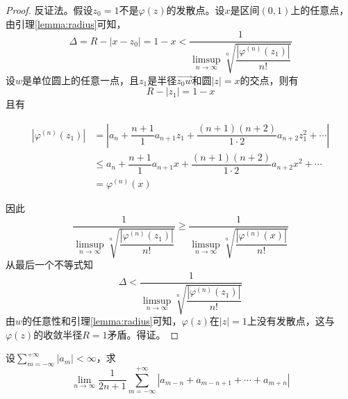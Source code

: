 \begin{proof}

    反证法。假设$z_0 = 1$不是$\varphi(z)$的发散点。设$x$是区间$(0, 1)$上的任意点，由引理\ref{lemma:radius}可知，
    $$\Delta = R - |x - z_0| = 1 - x < \dfrac{1}{\limsup\limits_{n \to \infty}{\sqrt[n]{\dfrac{|\varphi^{(n)}(z_1)|}{n!}}}}$$
    设$w$是单位圆上的任意一点，且$z_1$是半径$\vec{z_0w}$和圆$|z| = x$的交点，则有
    $$R - |z_1| = 1 - x$$
    且有
    
    \begin{align*}
        |\varphi^{(n)}(z_1)| & = \left| a_n + \dfrac{n + 1}{1} a_{n + 1}z_1 + \dfrac{(n + 1)(n + 2)}{1 \cdot 2}a_{n + 2}z_1^2 + \cdots \right| \\
        & \leq a_n + \dfrac{n + 1}{1} a_{n + 1}x + \dfrac{(n + 1)(n + 2)}{1 \cdot 2}a_{n + 2}x^2 + \cdots \\
        & = \varphi^{(n)}(x)
    \end{align*}

    因此
    $$\dfrac{1}{\limsup\limits_{n \to \infty}{\sqrt[n]{\dfrac{|\varphi^{(n)}(z_1)|}{n!}}}} \geq \dfrac{1}{\limsup\limits_{n \to \infty}{\sqrt[n]{\dfrac{|\varphi^{(n)}(x)|}{n!}}}}$$
    从最后一个不等式知
    $$\Delta < \dfrac{1}{\limsup\limits_{n \to \infty}{\sqrt[n]{\dfrac{|\varphi^{(n)}(z_1)|}{n!}}}}$$
    由$w$的任意性和引理\ref{lemma:radius}可知，$\varphi(z)$在$|z| = 1$上没有发散点，这与$\varphi(z)$的收敛半径$R = 1$矛盾。得证。

\end{proof}

\begin{proposition}

    设$\sum\limits_{m = -\infty}^{+\infty}{|a_m|} < \infty$，求
    $$\lim\limits_{n \to \infty}{\dfrac{1}{2n + 1}\sum\limits_{m = -\infty}^{+\infty}{|a_{m - n} + a_{m - n + 1} + \cdots + a_{m + n}|}}$$

\end{proposition}


